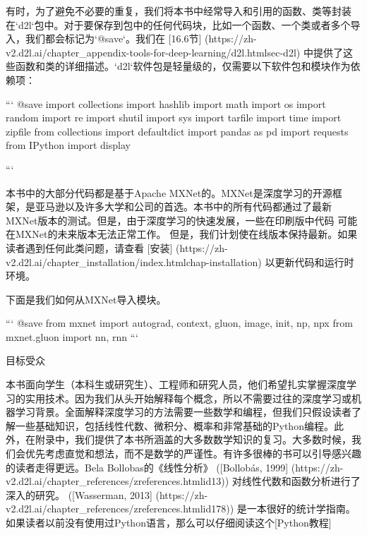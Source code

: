 有时，为了避免不必要的重复，我们将本书中经常导入和引用的函数、类等封装在`d2l`包中。对于要保存到包中的任何代码块，比如一个函数、一个类或者多个导入，我们都会标记为`@save`。我们在 [16.6节]
(https://zh-v2.d2l.ai/chapter\_appendix-tools-for-deep-learning/d2l.htmlsec-d2l) 
中提供了这些函数和类的详细描述。`d2l`软件包是轻量级的，仅需要以下软件包和模块作为依赖项：


```
@save
import collections
import hashlib
import math
import os
import random
import re
import shutil
import sys
import tarfile
import time
import zipfile
from collections import defaultdict
import pandas as pd
import requests
from IPython import display

```


本书中的大部分代码都是基于Apache MXNet的。MXNet是深度学习的开源框架，是亚马逊以及许多大学和公司的首选。本书中的所有代码都通过了最新MXNet版本的测试。但是，由于深度学习的快速发展，一些在印刷版中代码 可能在MXNet的未来版本无法正常工作。 但是，我们计划使在线版本保持最新。如果读者遇到任何此类问题，请查看 [安装]
(https://zh-v2.d2l.ai/chapter\_installation/index.htmlchap-installation)
 以更新代码和运行时环境。

下面是我们如何从MXNet导入模块。

```
@save
from mxnet import autograd, context, gluon, image, init, np, npx
from mxnet.gluon import nn, rnn
```


 目标受众

本书面向学生（本科生或研究生）、工程师和研究人员，他们希望扎实掌握深度学习的实用技术。因为我们从头开始解释每个概念，所以不需要过往的深度学习或机器学习背景。全面解释深度学习的方法需要一些数学和编程，但我们只假设读者了解一些基础知识，包括线性代数、微积分、概率和非常基础的Python编程。此外，在附录中，我们提供了本书所涵盖的大多数数学知识的复习。大多数时候，我们会优先考虑直觉和想法，而不是数学的严谨性。有许多很棒的书可以引导感兴趣的读者走得更远。Bela Bollobas的《线性分析》 ([Bollobás, 1999]
(https://zh-v2.d2l.ai/chapter\_references/zreferences.htmlid13)) 
对线性代数和函数分析进行了深入的研究。 ([Wasserman, 2013]
(https://zh-v2.d2l.ai/chapter\_references/zreferences.htmlid178))
是一本很好的统计学指南。如果读者以前没有使用过Python语言，那么可以仔细阅读这个[Python教程]

